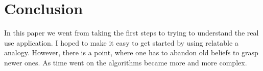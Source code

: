 \section*{Conclusion}

In this paper we went from taking the first steps to trying to understand the real use application. 
I hoped to make it easy to get started by using relatable a analogy.
However, there is a point, where one has to abandon old beliefs to grasp newer ones.
As time went on the algorithms became more and more complex. 
